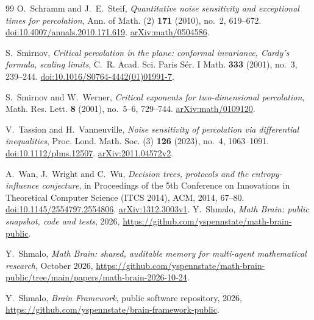 \documentclass[11pt]{amsart}
\theoremstyle{remark}
\begin{document}
\begin{thebibliography}{99}
O.~Schramm and J.~E.~Steif,
\emph{Quantitative noise sensitivity and exceptional times for percolation},
Ann. of Math. (2) \textbf{171} (2010), no.~2, 619--672.
\href{https://doi.org/10.4007/annals.2010.171.619}{doi:10.4007/annals.2010.171.619}.
\href{https://arxiv.org/abs/math/0504586}{arXiv:math/0504586}.

S.~Smirnov,
\emph{Critical percolation in the plane: conformal invariance, Cardy's formula, scaling limits},
C.~R. Acad. Sci. Paris S\'er. I Math. \textbf{333} (2001), no.~3, 239--244.
\href{https://doi.org/10.1016/S0764-4442(01)01991-7}{doi:10.1016/S0764-4442(01)01991-7}.

S.~Smirnov and W.~Werner,
\emph{Critical exponents for two-dimensional percolation},
Math. Res. Lett. \textbf{8} (2001), no.~5--6, 729--744.
\href{https://arxiv.org/abs/math/0109120}{arXiv:math/0109120}.

V.~Tassion and H.~Vanneuville,
\emph{Noise sensitivity of percolation via differential inequalities},
Proc. Lond. Math. Soc. (3) \textbf{126} (2023), no.~4, 1063--1091.
\href{https://doi.org/10.1112/plms.12507}{doi:10.1112/plms.12507}.
\href{https://arxiv.org/abs/2011.04572v2}{arXiv:2011.04572v2}.

A.~Wan, J.~Wright and C.~Wu,
\emph{Decision trees, protocols and the entropy-influence conjecture},
in Proceedings of the 5th Conference on Innovations in Theoretical Computer Science (ITCS 2014),
ACM, 2014, 67--80.
\href{https://doi.org/10.1145/2554797.2554806}{doi:10.1145/2554797.2554806}.
\href{https://arxiv.org/abs/1312.3003v1}{arXiv:1312.3003v1}.
 Y.~Shmalo, \emph{Math Brain: public snapshot, code and tests}, 2026, \url{https://github.com/yspennstate/math-brain-public}.

 Y.~Shmalo, \emph{Math Brain: shared, auditable memory for multi-agent mathematical research}, October 2026, \url{https://github.com/yspennstate/math-brain-public/tree/main/papers/math-brain-2026-10-24}.

 Y.~Shmalo, \emph{Brain Framework}, public software repository, 2026, \url{https://github.com/yspennstate/brain-framework-public}.

\end{thebibliography}
\end{document}

